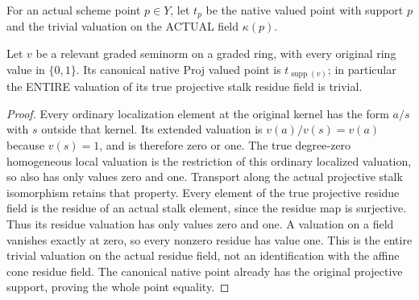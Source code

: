 \begin{definition}
\label{def:seven-native-trivial-at}
\leanok
For an actual scheme point $p\in Y$, let $t_p$ be the native valued point
with support $p$ and the trivial valuation on the ACTUAL field $\kappa(p)$.
\end{definition}

\begin{lemma}
\label{lem:seven-native-binary-residue}
\leanok
Let $v$ be a relevant graded seminorm on a graded ring, with every original
ring value in $\{0,1\}$. Its canonical native Proj valued point is
$t_{\operatorname{supp}(v)}$; in particular the ENTIRE valuation of its
true projective stalk residue field is trivial.
\end{lemma}
\begin{proof}
Every ordinary localization element at the original kernel has the form
$a/s$ with $s$ outside that kernel. Its extended valuation is
$v(a)/v(s)=v(a)$ because $v(s)=1$, and is therefore zero or one. The true
degree-zero homogeneous local valuation is the restriction of this ordinary
localized valuation, so also has only values zero and one. Transport along
the actual projective stalk isomorphism retains that property. Every element
of the true projective residue field is the residue of an actual stalk
element, since the residue map is surjective. Thus its residue valuation has
only values zero and one. A valuation on a field vanishes exactly at zero,
so every nonzero residue has value one. This is the entire trivial valuation
on the actual residue field, not an identification with the affine cone
residue field. The canonical native point already has the original projective
support, proving the whole point equality.
\end{proof}

